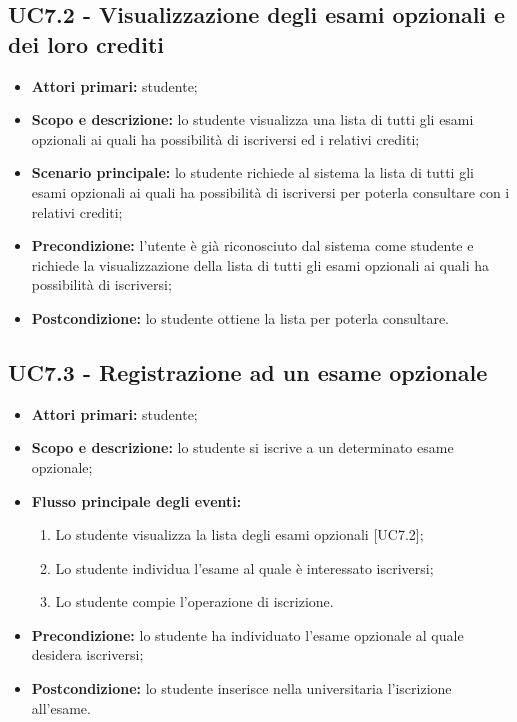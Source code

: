 \documentclass[AnalisiDeiRequisiti.tex]{subfiles}
\begin{document}
\subsection{UC7.2 - Visualizzazione degli esami opzionali e dei loro crediti}
\begin{itemize}
	\item \textbf{Attori primari:} studente;
	\item \textbf{Scopo e descrizione:} lo studente visualizza una lista di tutti gli esami opzionali ai quali ha possibilità di iscriversi ed i relativi crediti;
	\item \textbf{Scenario principale:} lo studente richiede al sistema la lista di tutti gli esami opzionali ai quali ha possibilità di iscriversi per poterla consultare con i relativi crediti;
	\item \textbf{Precondizione:} l'utente è già riconosciuto dal sistema come studente e richiede la visualizzazione della lista di tutti gli esami opzionali ai quali ha possibilità di iscriversi;
	\item \textbf{Postcondizione:} lo studente ottiene la lista per poterla consultare.
\end{itemize}

\subsection{UC7.3 - Registrazione ad un esame opzionale}
\begin{itemize}
	\item \textbf{Attori primari:} studente;
	\item \textbf{Scopo e descrizione:} lo studente si iscrive a un determinato esame opzionale;
	\item \textbf{Flusso principale degli eventi:}
	\begin{enumerate}
		\item Lo studente visualizza la lista degli esami opzionali [UC7.2];
		\item Lo studente individua l'esame al quale è interessato iscriversi;
		\item Lo studente compie l'operazione di iscrizione.
	\end{enumerate}
	\item \textbf{Precondizione:} lo studente ha individuato l'esame opzionale al quale desidera iscriversi;
	\item \textbf{Postcondizione:} lo studente inserisce nella  universitaria l'iscrizione all'esame.
\end{itemize}
\end{document}
